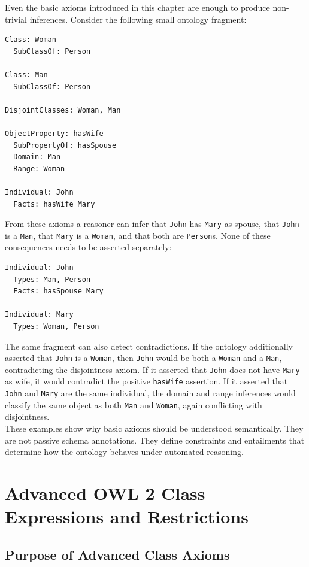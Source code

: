 \documentclass{scrbook}
\begin{document}
	Even the basic axioms introduced in this chapter are enough to produce non-trivial inferences. Consider the following small ontology fragment:
	\begin{lstlisting}
Class: Woman
  SubClassOf: Person

Class: Man
  SubClassOf: Person

DisjointClasses: Woman, Man

ObjectProperty: hasWife
  SubPropertyOf: hasSpouse
  Domain: Man
  Range: Woman

Individual: John
  Facts: hasWife Mary
	\end{lstlisting}
	
	From these axioms a reasoner can infer that \texttt{John} has \texttt{Mary} as spouse, that \texttt{John} is a \texttt{Man}, that \texttt{Mary} is a \texttt{Woman}, and that both are \texttt{Person}s. None of these consequences needs to be asserted separately:
	\begin{lstlisting}
Individual: John
  Types: Man, Person
  Facts: hasSpouse Mary

Individual: Mary
  Types: Woman, Person
	\end{lstlisting}
	
	The same fragment can also detect contradictions. If the ontology additionally asserted that \texttt{John} is a \texttt{Woman}, then \texttt{John} would be both a \texttt{Woman} and a \texttt{Man}, contradicting the disjointness axiom. If it asserted that \texttt{John} does not have \texttt{Mary} as wife, it would contradict the positive \texttt{hasWife} assertion. If it asserted that \texttt{John} and \texttt{Mary} are the same individual, the domain and range inferences would classify the same object as both \texttt{Man} and \texttt{Woman}, again conflicting with disjointness.\\
	
	These examples show why basic axioms should be understood semantically. They are not passive schema annotations. They define constraints and entailments that determine how the ontology behaves under automated reasoning.
	
	\chapter{Advanced OWL 2 Class Expressions and Restrictions}
	
	\section{Purpose of Advanced Class Axioms}
	
\end{document}

